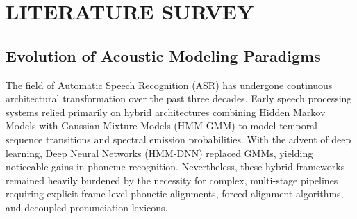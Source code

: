 \chapter{LITERATURE SURVEY}
\label{ch:literature}

\section{Evolution of Acoustic Modeling Paradigms}
The field of Automatic Speech Recognition (ASR) has undergone continuous architectural transformation over the past three decades. Early speech processing systems relied primarily on hybrid architectures combining Hidden Markov Models with Gaussian Mixture Models (HMM-GMM) to model temporal sequence transitions and spectral emission probabilities. With the advent of deep learning, Deep Neural Networks (HMM-DNN) replaced GMMs, yielding noticeable gains in phoneme recognition. Nevertheless, these hybrid frameworks remained heavily burdened by the necessity for complex, multi-stage pipelines requiring explicit frame-level phonetic alignments, forced alignment algorithms, and decoupled pronunciation lexicons.


